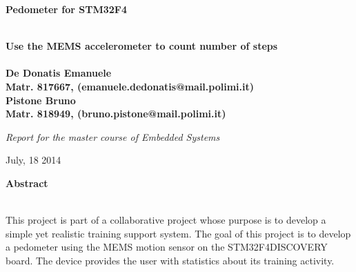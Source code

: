 \documentclass[a4paper,10pt]{article}
\newenvironment*{mytitle}{\begin{LARGE}\bf}{\end{LARGE}\\}%
\newenvironment*{mysubtitle}{\bf}{\\[1.5ex]}%
\newenvironment*{myabstract}{\begin{Large}\bf}{\end{Large}\\[2.5ex]}%
\begin{document}
\begin{mytitle}Pedometer for STM32F4\end{mytitle}
\begin{mysubtitle}Use the MEMS accelerometer to count number of steps\end{mysubtitle}
%
%
\\
De Donatis Emanuele\\
Matr. 817667, (emanuele.dedonatis@mail.polimi.it)\\
\hspace{10ex}
Pistone Bruno\\
Matr. 818949, (bruno.pistone@mail.polimi.it)\\
\begin{flushright}
\emph{Report for the master course of Embedded Systems}\\
\end{flushright}

July, 18 2014\\
\hspace{10ex}

\begin{myabstract} Abstract \end{myabstract}
This project is part of a collaborative project whose purpose is to develop a simple 
yet realistic training support system. The goal of this project is to develop a pedometer 
using the MEMS motion sensor on the STM32F4DISCOVERY board. The device provides
the user with statistics about its training activity.
\end{document}
